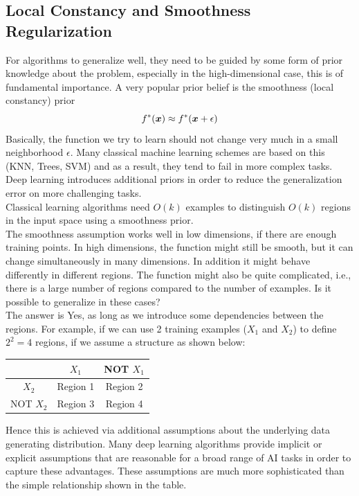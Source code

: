\begin{multicols}{2}
	\subsection{Local Constancy and Smoothness Regularization}
	For algorithms to generalize well, they need to be guided by some form of prior knowledge about the problem, especially in the high-dimensional case, this is of fundamental importance.
	A very popular prior belief is the smoothness (local constancy) prior
	\[ f^\ast ({\bm{x}}) \approx f^\ast ({\bm{x}} + \epsilon) \]
	Basically, the function we try to learn should not change very much in a small neighborhood $\epsilon$.
	Many classical machine learning schemes are based on this (KNN, Trees, SVM) and as a result, they tend to fail in more complex tasks.
	Deep learning introduces additional priors in order to reduce the generalization error on more challenging tasks.\\
	Classical learning algorithms need $O(k)$ examples to distinguish $O(k)$ regions in the input space using a smoothness prior.\\

	The smoothness assumption works well in low dimensions, if there are enough training points.
	In high dimensions, the function might still be smooth, but it can change simultaneously in many dimensions.
	In addition it might behave differently in different regions.
	The function might also be quite complicated, i.e., there is a large number of regions compared to the number of examples. Is it possible to generalize in these cases?\\

	The answer is Yes, as long as we introduce some dependencies between the regions.
	For example, if we can use 2 training examples ($X_1$ and $X_2$) to define $2^2=4$ regions, if we assume a structure as shown below:
	\begin{table}[H]
		\centering
		\begin{tabular}{c|c|c|}
			& $X_1$ & NOT $X_1$ \\
			\hline
			$X_2$ & Region 1 & Region 2 \\
			\hline
			NOT $X_2$ & Region 3 & Region 4 \\
			\hline
		\end{tabular}
	\end{table}

	Hence this is achieved via additional assumptions about the underlying data generating distribution.
	Many deep learning algorithms provide implicit or explicit assumptions that are reasonable for a broad range of AI tasks in order to capture these advantages.
	These assumptions are much more sophisticated than the simple relationship shown in the table.\\


\end{multicols}
